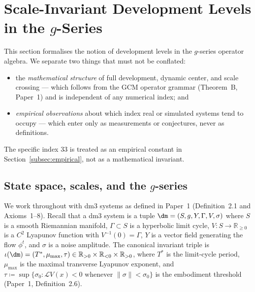 
\section{Scale-Invariant Development Levels in the
  \texorpdfstring{$g$}{g}-Series}
\label{sec:g6}

This section formalises the notion of development levels in the
$g$-series operator algebra. We separate two things that must not
be conflated:
\begin{itemize}
  \item the \emph{mathematical structure} of full development,
    dynamic center, and scale crossing — which follows from
    the GCM operator grammar (Theorem~B, Paper~1) and is
    independent of any numerical index; and
  \item \emph{empirical observations} about which index real
    or simulated systems tend to occupy — which enter only as
    measurements or conjectures, never as definitions.
\end{itemize}
The specific index $33$ is treated as an empirical constant
in Section~\ref{subsec:empirical}, not as a mathematical invariant.

\subsection{State space, scales, and the \texorpdfstring{$g$}{g}-series}

We work throughout with dm3 systems as defined in Paper~1
(Definition~2.1 and Axioms~1--8). Recall that a dm3 system is a
tuple $\dm = (S, g, Y, \Gamma, V, \sigma)$ where $S$ is a smooth
Riemannian manifold, $\Gamma \subset S$ is a hyperbolic limit cycle,
$V : S \to \mathbb{R}_{\ge 0}$ is a $C^2$ Lyapunov function with
$V^{-1}(0) = \Gamma$, $Y$ is a vector field generating the flow
$\phi^t$, and $\sigma$ is a noise amplitude. The canonical invariant
triple is $\iota(\dm) = (T^*, \mu_{\max}, \tau) \in \mathbb{R}_{>0}
\times \mathbb{R}_{<0} \times \mathbb{R}_{>0}$, where $T^*$ is the
limit-cycle period, $\mu_{\max}$ is the maximal transverse Lyapunov
exponent, and $\tau \coloneqq \sup\{\sigma_0 : \mathcal{L}V(x) < 0
\text{ whenever } \|\sigma\| < \sigma_0\}$ is the embodiment
threshold (Paper~1, Definition~2.6).


